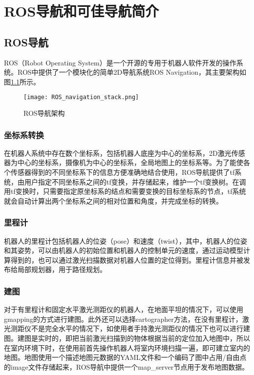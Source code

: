 
\chapter{ROS导航和可佳导航简介}

\section{ROS导航}

ROS（Robot Operating System）是一个开源的专用于机器人软件开发的操作系统。ROS中提供了一个模块化的简单2D导航系统ROS Navigation，其主要架构如图\ref{fig:rosnav}所示。

\begin{figure}[htb]
  \centering
  \texttt{[image: ROS\_navigation\_stack.png]}
  \caption{ROS导航架构}
  \label{fig:rosnav}
\end{figure}

\subsection{坐标系转换}
  在机器人系统中存在数个坐标系，包括机器人底座为中心的坐标系，2D激光传感器为中心的坐标系，摄像机为中心的坐标系，全局地图上的坐标系等。为了能使各个传感器得到的不同坐标系下的信息方便准确地结合使用，ROS导航提供了tf系统，由用户指定不同坐标系之间的tf变换，并存储起来，维护一个tf变换树。在调用tf变换时，只需要指定原坐标系的结点和需要变换的目标坐标系的节点，tf系统就会自动计算出两个坐标系之间的相对位置和角度，并完成坐标的转换。

\subsection{里程计}
  机器人的里程计包括机器人的位姿（pose）和速度（twist），其中，机器人的位姿和其姿势，可以由机器人的初始位置和机器人的控制单元的速度，通过运动模型计算得到的，也可以通过激光扫描数据对机器人位置的定位得到。里程计信息并被发布给局部规划器，用于路径规划。

\subsection{建图}
  对于有里程计和固定水平激光测距仪的机器人，在地面平坦的情况下，可以使用gmapping\cite{grisetti2007improved}的方式进行建图。此外还可以选择cartographer\cite{hess2016real}方法，在没有里程计，激光测距仪不是完全水平的情况下，如使用者手持激光测距仪的情况下也可以进行建图。建图是实时的，即把当前激光扫描到的物体根据当前的定位加入地图中，所以在室内环境下时，在使用前首先操作机器人将室内环境扫描一遍，即可建立室内的地图。地图使用一个描述地图元数据的YAML文件和一个编码了图中占用/自由点的image文件存储起来，ROS导航中提供一个map\_server节点用于发布地图数据。

